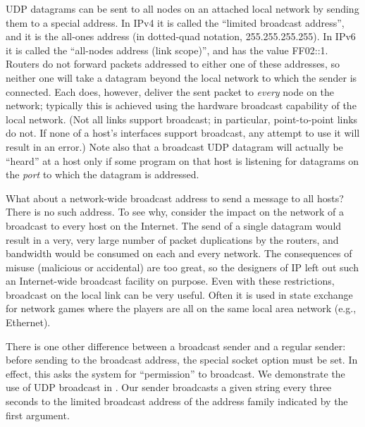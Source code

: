 \noindent UDP datagrams can be sent to all nodes on an attached local
network by sending them to a special address.  In IPv4 it is
called the ``limited broadcast address'', and it is the all-ones
address (in dotted-quad notation, 255.255.255.255).
In IPv6 it is called the ``all-nodes address (link scope)'', and has
the value %
FF02::1.  Routers do not forward packets addressed to either one of
these addresses, so neither one will take a datagram beyond the local
network to which the sender is connected.  Each does,
however, deliver the sent packet to \emph{every\/} node on the
network; typically this is achieved using the hardware broadcast
capability of the local network. (Not all links support broadcast; in
particular, point-to-point links do not.  If
none of a host's interfaces support broadcast, any attempt to use it
will result in an error.)
Note also that a broadcast UDP datagram will actually be ``heard'' at a host
only if some program on that
host is listening for datagrams on the \emph{port\/} to which the
datagram is addressed.

What about a network-wide broadcast address to send a message to all
hosts?  There is no such address.  To see
why, consider the impact on the network of a broadcast to every host on
the Internet.  The send of a single datagram would result in a very, very
large
number of packet duplications by the routers, and bandwidth would be
consumed on each and every network.  The consequences of misuse
(malicious or accidental) are too great, so the designers of IP left
out such an Internet-wide broadcast facility  on purpose.   Even with these
restrictions, broadcast on the local link can be very useful.  Often it is
used in state exchange for network games where the players are all on
the same local area network (e.g., Ethernet).

There is one other difference between a broadcast sender and a regular
sender:  before sending to the broadcast address, the special socket
option  must be set.  In effect, this asks the
system for ``permission'' to broadcast.
%
We demonstrate the use of
UDP broadcast in .  Our sender broadcasts 
a given string every three seconds to the limited broadcast address of
the address family indicated by the first argument.


